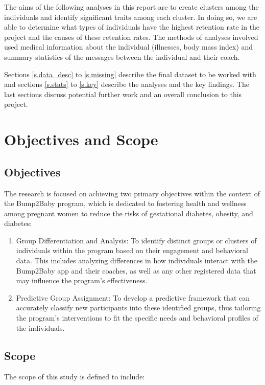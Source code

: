 \documentclass[12pt]{article}
\begin{document}
		The aims of the following analyses in this report are to create clusters among the individuals and identify significant traits among each cluster. In doing so, we are able to determine what types of individuals have the highest retention rate in the project and the causes of these retention rates. The methods of analyses involved used medical information about the individual (illnesses, body mass index) and summary statistics of the messages between the individual and their coach.
		
		Sections \ref{s.data_desc} to \ref{s.missing} describe the final dataset to be worked with and sections \ref{s.stats} to \ref{s.key} describe the analyses and the key findings. The last sections discuss potential further work and an overall conclusion to this project.

\section{Objectives and Scope}

\label{s.obj&s}

\subsection{Objectives}
The research is focused on achieving two primary objectives within the context of the Bump2Baby program, which is dedicated to fostering health and wellness among pregnant women to reduce the risks of gestational diabetes, obesity, and diabetes:

\begin{enumerate}
\item Group Differentiation and Analysis: To identify distinct groups or clusters of individuals within the program based on their engagement and behavioral data. This includes analyzing differences in how individuals interact with the Bump2Baby app and their coaches, as well as any other registered data that may influence the program's effectiveness.

\item Predictive Group Assignment: To develop a predictive framework that can accurately classify new participants into these identified groups, thus tailoring the program's interventions to fit the specific needs and behavioral profiles of the individuals.
\end{enumerate}

\subsection{Scope}
The scope of this study is defined to include:
\end{document}
